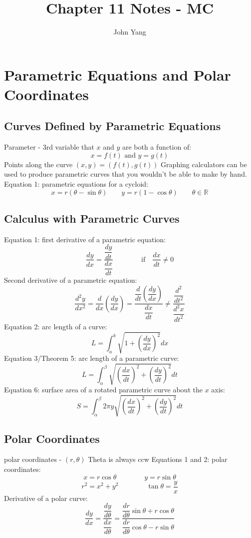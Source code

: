 \documentclass{article}
\title{Chapter 11 Notes - MC} %
\author{John Yang}
\begin{document}
    \maketitle
    \tableofcontents
    \section{Parametric Equations and Polar Coordinates} %
    \subsection{Curves Defined by Parametric Equations} %
    \begin{outline}
        \1 Parameter - 3rd variable that $x$ and $y$ are both a function of: \[x=f(t)\text{ and }y=g(t)\]
        \1 Points along the curve \((x,y)=(f(t),g(t))\)
        \1 Graphing calculators can be used to produce parametric curves that you wouldn't be able to make by hand. 
        \1 Equation 1: parametric equations for a cycloid: \[x=r(\theta-\sin\theta) \qquad y=r(1-\cos\theta) \qquad \theta\in\mathbb{R}\]
    \end{outline}
    \subsection{Calculus with Parametric Curves}
    \begin{outline}
        \1 Equation 1: first derivative of a parametric equation: \[\dfrac{dy}{dx}=\dfrac{\dfrac{dy}{dt}}{\dfrac{dx}{dt}}\qquad\qquad\text{if}\quad\dfrac{dx}{dt}\neq0\]
        \1 Second derivative of a parametric equation: \[\dfrac{d^2y}{dx^2}=\dfrac{d}{dx}\left(\dfrac{dy}{dx}\right)=\dfrac{\dfrac{d}{dt}\left(\dfrac{dy}{dx}\right)}{\dfrac{dx}{dt}}\neq\dfrac{\dfrac{d^2}{dt^2}}{\dfrac{d^2x}{dt^2}}\]
        \1 Equation 2: arc length of a curve: \[L=\int^b_a\sqrt{1+\left(\dfrac{dy}{dx}\right)^2}dx\]
        \1 Equation 3/Theorem 5: arc length of a parametric curve: \[L=\int^\beta_\alpha\sqrt{\left(\dfrac{dx}{dt}\right)^2+\left(\dfrac{dy}{dt}\right)^2}dt\]
        \1 Equation 6: surface area of a rotated parametric curve about the $x$ axis: \[S=\int^\beta_\alpha2\pi y\sqrt{\left(\dfrac{dx}{dt}\right)^2+\left(\dfrac{dy}{dt}\right)^2}dt\]

    \end{outline}
    \subsection{Polar Coordinates}
    \begin{outline}
        \1 polar coordinates - \((r,\theta)\)
        \1 Theta is always ccw 
        \1 Equations 1 and 2: polar coordinates: \[x=r\cos\theta\qquad\qquad y=r\sin\theta\]\[r^2=x^2+y^2\qquad\qquad\tan\theta=\dfrac{y}{x}\]
        \1 Derivative of a polar curve: \[\dfrac{dy}{dx}=\dfrac{\dfrac{dy}{d\theta}}{\dfrac{dx}{d\theta}}=\dfrac{\dfrac{dr}{d\theta}\sin\theta+r\cos\theta}{\dfrac{dr}{d\theta}\cos\theta-r\sin\theta}\]
    \end{outline}
\end{document}
